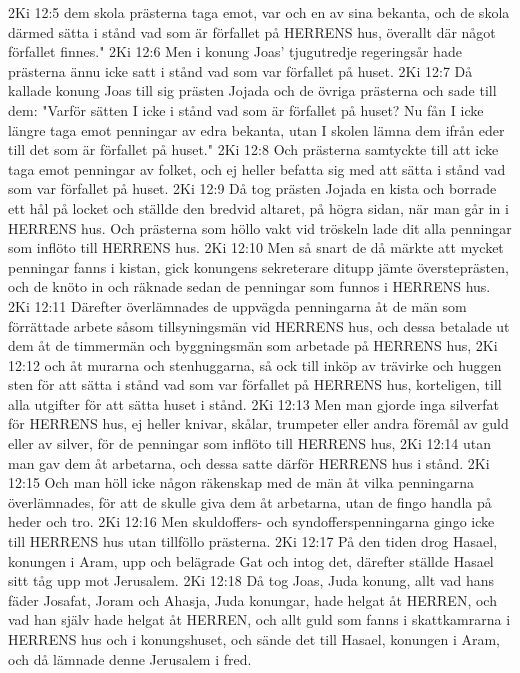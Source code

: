 2Ki 12:5  dem skola prästerna taga emot, var och en av sina bekanta, och de skola därmed sätta i stånd vad som är förfallet på HERRENS hus, överallt där något förfallet finnes."
2Ki 12:6  Men i konung Joas' tjugutredje regeringsår hade prästerna ännu icke satt i stånd vad som var förfallet på huset.
2Ki 12:7  Då kallade konung Joas till sig prästen Jojada och de övriga prästerna och sade till dem: "Varför sätten I icke i stånd vad som är förfallet på huset? Nu fån I icke längre taga emot penningar av edra bekanta, utan I skolen lämna dem ifrån eder till det som är förfallet på huset."
2Ki 12:8  Och prästerna samtyckte till att icke taga emot penningar av folket, och ej heller befatta sig med att sätta i stånd vad som var förfallet på huset.
2Ki 12:9  Då tog prästen Jojada en kista och borrade ett hål på locket och ställde den bredvid altaret, på högra sidan, när man går in i HERRENS hus. Och prästerna som höllo vakt vid tröskeln lade dit alla penningar som inflöto till HERRENS hus.
2Ki 12:10  Men så snart de då märkte att mycket penningar fanns i kistan, gick konungens sekreterare ditupp jämte översteprästen, och de knöto in och räknade sedan de penningar som funnos i HERRENS hus.
2Ki 12:11  Därefter överlämnades de uppvägda penningarna åt de män som förrättade arbete såsom tillsyningsmän vid HERRENS hus, och dessa betalade ut dem åt de timmermän och byggningsmän som arbetade på HERRENS hus,
2Ki 12:12  och åt murarna och stenhuggarna, så ock till inköp av trävirke och huggen sten för att sätta i stånd vad som var förfallet på HERRENS hus, korteligen, till alla utgifter för att sätta huset i stånd.
2Ki 12:13  Men man gjorde inga silverfat för HERRENS hus, ej heller knivar, skålar, trumpeter eller andra föremål av guld eller av silver, för de penningar som inflöto till HERRENS hus,
2Ki 12:14  utan man gav dem åt arbetarna, och dessa satte därför HERRENS hus i stånd.
2Ki 12:15  Och man höll icke någon räkenskap med de män åt vilka penningarna överlämnades, för att de skulle giva dem åt arbetarna, utan de fingo handla på heder och tro.
2Ki 12:16  Men skuldoffers- och syndofferspenningarna gingo icke till HERRENS hus utan tillföllo prästerna.
2Ki 12:17  På den tiden drog Hasael, konungen i Aram, upp och belägrade Gat och intog det, därefter ställde Hasael sitt tåg upp mot Jerusalem.
2Ki 12:18  Då tog Joas, Juda konung, allt vad hans fäder Josafat, Joram och Ahasja, Juda konungar, hade helgat åt HERREN, och vad han själv hade helgat åt HERREN, och allt guld som fanns i skattkamrarna i HERRENS hus och i konungshuset, och sände det till Hasael, konungen i Aram, och då lämnade denne Jerusalem i fred.
